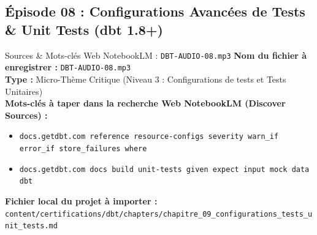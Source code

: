 \documentclass[11pt,a4paper]{article}
\begin{document}
\subsection{Épisode 08 : Configurations Avancées de Tests \& Unit Tests (dbt 1.8+)}
\begin{sourcebox}{Sources \& Mots-clés Web NotebookLM : \texttt{DBT-AUDIO-08.mp3}}
\textbf{Nom du fichier à enregistrer :} \texttt{DBT-AUDIO-08.mp3}\\
\textbf{Type :} Micro-Thème Critique (Niveau 3 : Configurations de tests et Tests Unitaires)\\
\textbf{Mots-clés à taper dans la recherche Web NotebookLM (Discover Sources) :}
\begin{itemize}[noitemsep]
    \item \texttt{docs.getdbt.com reference resource-configs severity warn_if error_if store_failures where}
    \item \texttt{docs.getdbt.com docs build unit-tests given expect input mock data dbt}
\end{itemize}
\textbf{Fichier local du projet à importer :}
\texttt{content/certifications/dbt/chapters/chapitre_09_configurations_tests_unit_tests.md}
\end{sourcebox}
\end{document}
